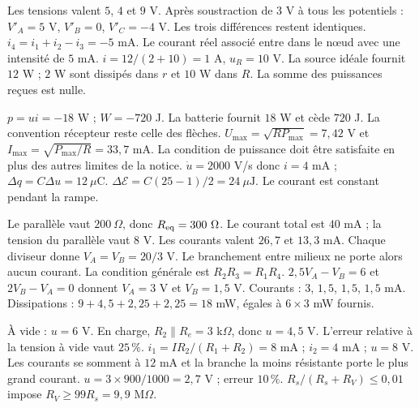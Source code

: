 Les tensions valent $5$, $4$ et $9$ V. Après soustraction de $3$ V à tous les potentiels : $V'_A=5$ V, $V'_B=0$, $V'_C=-4$ V. Les trois différences restent identiques.
$i_4=i_1+i_2-i_3=-5$ mA. Le courant réel associé entre dans le nœud avec une intensité de $5$ mA.
$i=12/(2+10)=1$ A, $u_R=10$ V. La source idéale fournit $12$ W ; $2$ W sont dissipés dans $r$ et $10$ W dans $R$. La somme des puissances reçues est nulle.


$p=ui=-18$ W ; $W=-720$ J. La batterie fournit $18$ W et cède $720$ J. La convention récepteur reste celle des flèches.
$U_{\max}=\sqrt{RP_{\max}}=7{,}42$ V et $I_{\max}=\sqrt{P_{\max}/R}=33{,}7$ mA. La condition de puissance doit être satisfaite en plus des autres limites de la notice.
$\dot u=2000$ V/s donc $i=4$ mA ; $\Delta q=C\Delta u=12\ \mu\mathrm{ C}$. $\Delta\mathcal E=C(25-1)/2=24\ \mu\mathrm{ J}$. Le courant est constant pendant la rampe.


Le parallèle vaut $200\ \Omega$, donc $R_{\rm eq}=300\ \Omega$. Le courant total est $40$ mA ; la tension du parallèle vaut $8$ V. Les courants valent $26{,}7$ et $13{,}3$ mA.
Chaque diviseur donne $V_A=V_B=20/3$ V. Le branchement entre milieux ne porte alors aucun courant. La condition générale est $R_2R_3=R_1R_4$.
$2{,}5V_A-V_B=6$ et $2V_B-V_A=0$ donnent $V_A=3$ V et $V_B=1{,}5$ V. Courants : $3$, $1{,}5$, $1{,}5$, $1{,}5$ mA. Dissipations : $9+4{,}5+2{,}25+2{,}25=18$ mW, égales à $6\times3$ mW fournis.


À vide : $u=6$ V. En charge, $R_2\parallel R_e=3$ k$\Omega$, donc $u=4{,}5$ V. L’erreur relative à la tension à vide vaut $25\,\%$.
$i_1=I R_2/(R_1+R_2)=8$ mA ; $i_2=4$ mA ; $u=8$ V. Les courants se somment à $12$ mA et la branche la moins résistante porte le plus grand courant.
$u=3\times900/1000=2{,}7$ V ; erreur $10\,\%$. $R_s/(R_s+R_V)\leq0{,}01$ impose $R_V\geq99R_s=9{,}9$ M$\Omega$.


